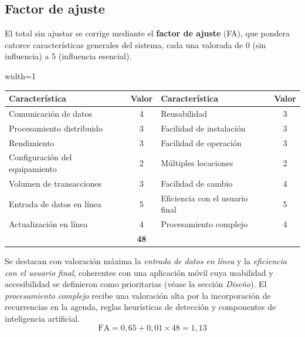 \documentclass[a4paper,12pt]{article}
\begin{document}
    \subsection{Factor de ajuste}
    \par El total sin ajustar se corrige mediante el \textbf{factor de ajuste} (FA), que pondera catorce características generales del sistema, cada una valorada de 0 (sin influencia) a 5 (influencia esencial).
    \begin{center}
        \begin{adjustbox}{width=1\textwidth}
            \begin{tabular}{ |p{6cm}|c|p{6cm}|c| }
                \hline
                \rowcolor{lightgray} \textbf{Característica} & \textbf{Valor} & \textbf{Característica} & \textbf{Valor} \\
                \hline
                Comunicación de datos & 4 & Reusabilidad & 3 \\
                \hline
                Procesamiento distribuido & 3 & Facilidad de instalación & 3 \\
                \hline
                Rendimiento & 3 & Facilidad de operación & 3 \\
                \hline
                Configuración del equipamiento & 2 & Múltiples locaciones & 2 \\
                \hline
                Volumen de transacciones & 3 & Facilidad de cambio & 4 \\
                \hline
                Entrada de datos en línea & 5 & Eficiencia con el usuario final & 5 \\
                \hline
                Actualización en línea & 4 & Procesamiento complejo & 4 \\
                \hline
                \rowcolor{lightgray} \multicolumn{3}{ |r| }{\textbf{Sumatoria de niveles de influencia}} & \textbf{48} \\
                \hline
            \end{tabular}
        \end{adjustbox}
    \end{center}
    \par Se destacan con valoración máxima la \textit{entrada de datos en línea} y la \textit{eficiencia con el usuario final}, coherentes con una aplicación móvil cuya usabilidad y accesibilidad se definieron como prioritarias (véase la sección \textit{Diseño}). El \textit{procesamiento complejo} recibe una valoración alta por la incorporación de recurrencias en la agenda, reglas heurísticas de detección y componentes de inteligencia artificial.
    \[ \mathrm{FA} = 0{,}65 + 0{,}01 \times 48 = 1{,}13 \]
\end{document}
